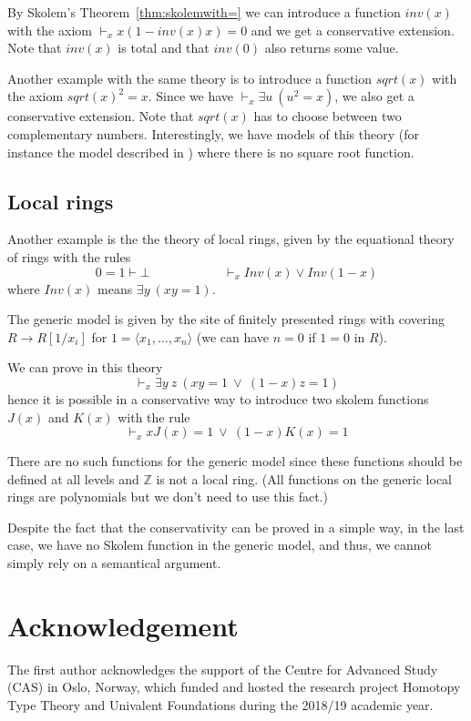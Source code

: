 \documentclass[10pt,a4paper]{article}
\newcommand{\ideal}[1]{\langle #1\rangle}
\newcommand{\ints}{\mathbb{Z}}
\begin{document}
By Skolem's Theorem~\ref{thm:skolemwith=} we can introduce a function $inv(x)$ with the axiom
$\vdash_x x(1 - inv(x) x) = 0$ and we get a conservative extension. Note that $inv(x)$
is total and that $inv(0)$ also returns some value.

 Another example with the same theory is to introduce a function $sqrt(x)$ with the axiom
$sqrt(x)^2 = x$. Since we have $\vdash_{x} \exists u~(u^2 = x)$, we also get a conservative
extension. Note that $sqrt(x)$ has to choose between two complementary numbers.
Interestingly, we have models of this theory (for instance the model described
in \cite{Mannaa}) where there is no square root function.

\subsection{Local rings}

 Another example is the the theory of local rings, given by the equational theory of rings
with the rules
$$
0=1\vdash\bot~~~~~~~~~~~~~~~~~~~~~~~~~~\vdash_x Inv(x)\vee Inv(1-x)
$$
where $Inv(x)$ means $\exists y~(xy = 1)$. 

The generic model is given by the site of finitely presented rings with covering
$R\rightarrow R[1/x_i]$ for $1 = \ideal{x_1,\dots,x_n}$ (we can have $n = 0$ if $1=0$ in $R$).

 We can prove in this theory
$$
\vdash_x \exists y~z~(x y = 1~\vee ~(1-x) z = 1)
$$
hence it is possible in a conservative way
to introduce two skolem functions $J(x)$ and $K(x)$ with the rule
$$
\vdash_x xJ(x) = 1~\vee~(1-x)K(x) = 1
$$

 There are no such functions for the generic model since these functions should be defined
at all levels and $\ints$ is not a local ring.
(All functions on the generic local rings are polynomials but we don't need to use this fact.)

\medskip

 Despite the fact that the conservativity can be proved in a simple way, in the last case, we
have no Skolem function in the generic model, and thus, we cannot simply rely on a semantical
argument.


\section{Acknowledgement}
The first author acknowledges the support of the Centre for Advanced Study (CAS) in Oslo, Norway, which funded and hosted the research project Homotopy Type Theory and Univalent Foundations during the 2018/19 academic year.
\end{document}

